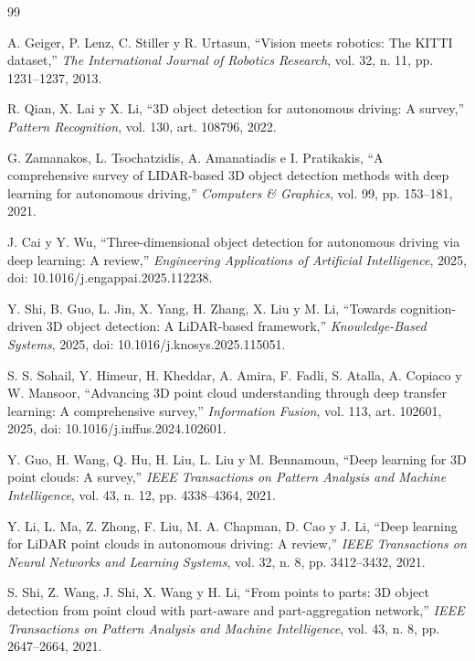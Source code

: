 \documentclass[11pt,letterpaper]{article}
\begin{document}
\begin{thebibliography}{99}
\small

A. Geiger, P. Lenz, C. Stiller y R. Urtasun, ``Vision meets robotics: The KITTI dataset,'' \emph{The International Journal of Robotics Research}, vol. 32, n.\textordmasculine{} 11, pp. 1231--1237, 2013.

R. Qian, X. Lai y X. Li, ``3D object detection for autonomous driving: A survey,'' \emph{Pattern Recognition}, vol. 130, art. 108796, 2022.

G. Zamanakos, L. Tsochatzidis, A. Amanatiadis e I. Pratikakis, ``A comprehensive survey of LIDAR-based 3D object detection methods with deep learning for autonomous driving,'' \emph{Computers \& Graphics}, vol. 99, pp. 153--181, 2021.

J. Cai y Y. Wu, ``Three-dimensional object detection for autonomous driving via deep learning: A review,'' \emph{Engineering Applications of Artificial Intelligence}, 2025, doi: 10.1016/j.engappai.2025.112238.

Y. Shi, B. Guo, L. Jin, X. Yang, H. Zhang, X. Liu y M. Li, ``Towards cognition-driven 3D object detection: A LiDAR-based framework,'' \emph{Knowledge-Based Systems}, 2025, doi: 10.1016/j.knosys.2025.115051.

S. S. Sohail, Y. Himeur, H. Kheddar, A. Amira, F. Fadli, S. Atalla, A. Copiaco y W. Mansoor, ``Advancing 3D point cloud understanding through deep transfer learning: A comprehensive survey,'' \emph{Information Fusion}, vol. 113, art. 102601, 2025, doi: 10.1016/j.inffus.2024.102601.

Y. Guo, H. Wang, Q. Hu, H. Liu, L. Liu y M. Bennamoun, ``Deep learning for 3D point clouds: A survey,'' \emph{IEEE Transactions on Pattern Analysis and Machine Intelligence}, vol. 43, n.\textordmasculine{} 12, pp. 4338--4364, 2021.

Y. Li, L. Ma, Z. Zhong, F. Liu, M. A. Chapman, D. Cao y J. Li, ``Deep learning for LiDAR point clouds in autonomous driving: A review,'' \emph{IEEE Transactions on Neural Networks and Learning Systems}, vol. 32, n.\textordmasculine{} 8, pp. 3412--3432, 2021.

S. Shi, Z. Wang, J. Shi, X. Wang y H. Li, ``From points to parts: 3D object detection from point cloud with part-aware and part-aggregation network,'' \emph{IEEE Transactions on Pattern Analysis and Machine Intelligence}, vol. 43, n.\textordmasculine{} 8, pp. 2647--2664, 2021.


\end{thebibliography}
\end{document}
